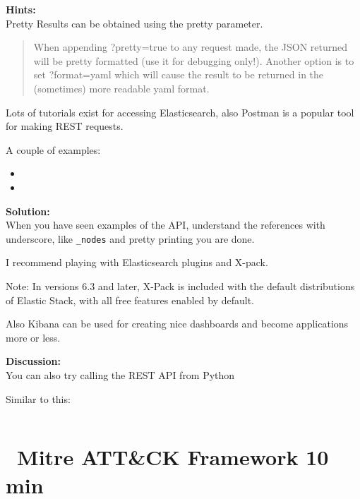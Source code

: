 \documentclass[a4paper,11pt,notitlepage]{report}
\begin{document}
{\bf Hints:}\\
Pretty Results can be obtained using the pretty parameter.
\begin{quote}
When appending ?pretty=true to any request made, the JSON returned will be pretty formatted (use it for debugging only!). Another option is to set ?format=yaml which will cause the result to be returned in the (sometimes) more readable yaml format.
\end{quote}

Lots of tutorials exist for accessing Elasticsearch, also Postman is a popular tool for making REST requests.

A couple of examples:
\begin{itemize}
\item {}
\item {}
\end{itemize}

{\bf Solution:}\\
When you have seen examples of the API, understand the references with underscore, like \verb+_nodes+ and pretty printing you are done.

I recommend playing with Elasticsearch plugins and X-pack.\\

Note: In versions 6.3 and later, X-Pack is included with the default distributions of Elastic Stack, with all free features enabled by default.

Also Kibana can be used for creating nice dashboards and become applications more or less.

{\bf Discussion:}\\
You can also try calling the REST API from Python

Similar to this:
\inputminted{python}{programs/rest-1.py}






\chapter{\faExclamationTriangle\ Mitre ATT\&CK Framework 10 min}
\label{ex:mitre-attack}


\end{document}
